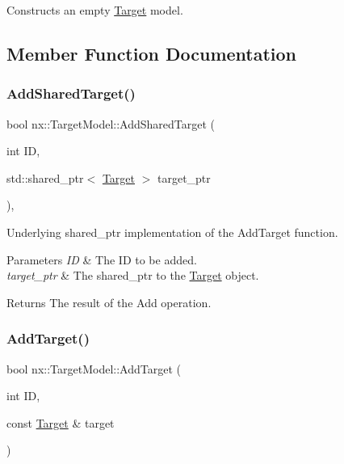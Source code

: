 Constructs an empty \hyperlink{structnx_1_1Target}{Target} model. 

\subsection{Member Function Documentation}
\mbox{\label{classnx_1_1TargetModel_a30aa54f7e05d026d06032279855a2b14}} 
\subsubsection{\texorpdfstring{Add\+Shared\+Target()}{AddSharedTarget()}}
{\footnotesize\ttfamily bool nx\+::\+Target\+Model\+::\+Add\+Shared\+Target (\begin{DoxyParamCaption}\item[{int}]{ID,  }\item[{std\+::shared\+\_\+ptr$<$ \hyperlink{structnx_1_1Target}{Target} $>$}]{target\+\_\+ptr }\end{DoxyParamCaption})\hspace{0.3cm}{\ttfamily [inline]}, {\ttfamily [protected]}}

Underlying shared\+\_\+ptr implementation of the Add\+Target function. 
\begin{DoxyParams}{Parameters}
{\em ID} & The ID to be added. \\
\hline
{\em target\+\_\+ptr} & The shared\+\_\+ptr to the \hyperlink{structnx_1_1Target}{Target} object. \\
\hline
\end{DoxyParams}
\begin{DoxyReturn}{Returns}
The result of the Add operation. 
\end{DoxyReturn}
\mbox{\label{classnx_1_1TargetModel_ab38b91d30509a7e981c456d74eecb07c}} 
\subsubsection{\texorpdfstring{Add\+Target()}{AddTarget()}}
{\footnotesize\ttfamily bool nx\+::\+Target\+Model\+::\+Add\+Target (\begin{DoxyParamCaption}\item[{int}]{ID,  }\item[{const \hyperlink{structnx_1_1Target}{Target} \&}]{target }\end{DoxyParamCaption})\hspace{0.3cm}{\ttfamily [inline]}}

